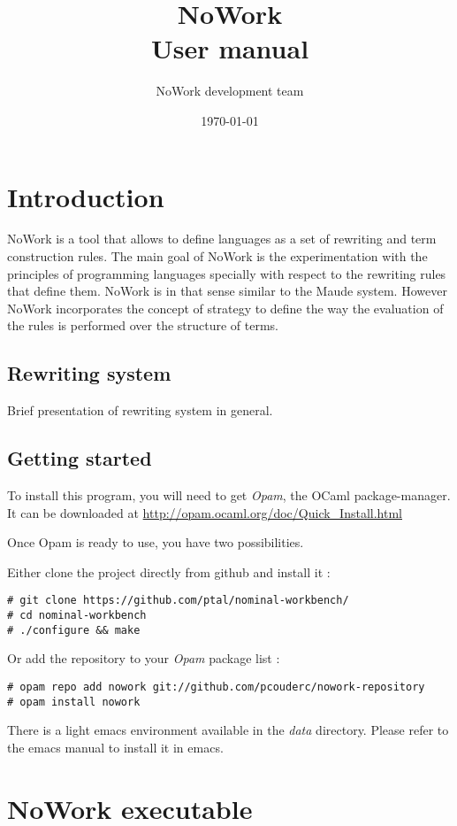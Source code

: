 \documentclass[12pt,a4paper]{article}
\title{NoWork\\
User manual}
\author{NoWork development team\\[2em]}
\date\today
\begin{document}
\maketitle


\section{Introduction}
NoWork is a tool that allows to define languages as a set of
rewriting and term construction rules. The main goal of NoWork
is the experimentation with the principles of programming languages
specially with respect to the rewriting rules that define them.
NoWork is in that sense similar to the Maude system. However NoWork
incorporates the concept of strategy to define the way the
evaluation of the rules is performed over the structure of terms.

\subsection{Rewriting system}
Brief presentation of rewriting system in general.

\subsection{Getting started}
To install this program, you will need to get \emph{Opam}, the OCaml package-manager.
It can be downloaded at \url{http://opam.ocaml.org/doc/Quick_Install.html}

Once Opam is ready to use, you have two possibilities. 

Either clone the project directly from github and install it :
\begin{verbatim}
# git clone https://github.com/ptal/nominal-workbench/
# cd nominal-workbench
# ./configure && make
\end{verbatim}

Or add the repository to your \emph{Opam} package list :
\begin{verbatim}
# opam repo add nowork git://github.com/pcouderc/nowork-repository
# opam install nowork
\end{verbatim}

There is a light emacs environment available in the \emph{data}
directory. Please refer to the emacs manual to install it in emacs.

\section{NoWork executable}
\end{document}

